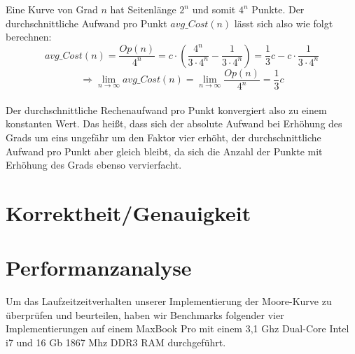 \documentclass[course=erap]{aspdoc}
\begin{document}
Eine Kurve von Grad $n$ hat Seitenlänge $2^n$ und somit $4^n$ Punkte. Der durchschnittliche Aufwand pro Punkt $avg\_Cost(n)$ lässt sich also wie folgt berechnen: \ \\
\[avg\_Cost(n) = \frac{Op(n)}{4^n} = c \cdot \left(\frac{4^n}{3 \cdot 4^n} - \frac{1}{3 \cdot 4^n}\right) = \frac{1}{3}c - c \cdot \frac{1}{3 \cdot 4^n}\] 
\[\Rightarrow \lim_{n\to\infty} avg\_Cost(n) = \lim_{n\to\infty} \frac{Op(n)}{4^n} = \frac{1}{3}c\]  \ \\ 
Der durchschnittliche Rechenaufwand pro Punkt konvergiert also zu einem konstanten Wert. Das heißt, dass sich der absolute Aufwand bei Erhöhung des Grads um eins ungefähr um den Faktor vier erhöht, der durchschnittliche Aufwand pro Punkt aber gleich bleibt, da sich die Anzahl der Punkte mit Erhöhung des Grads ebenso vervierfacht.



\section{Korrektheit/Genauigkeit}


\section{Performanzanalyse}
Um das Laufzeitzeitverhalten unserer Implementierung der Moore-Kurve zu überprüfen und beurteilen, haben wir Benchmarks folgender vier Implementierungen auf einem MaxBook Pro mit einem 3,1 Ghz Dual-Core Intel i7 und 16 Gb 1867 Mhz DDR3 RAM durchgeführt.
\end{document}
